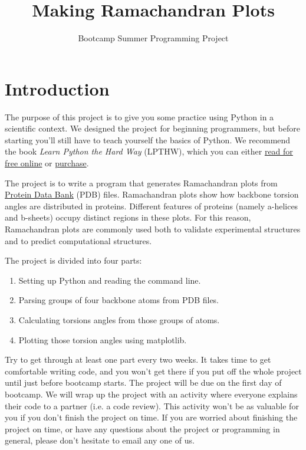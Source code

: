 \documentclass{article}
\newcommand{\ahelices}{\textgreek{a}-helices}
\newcommand{\bsheets}{\textgreek{b}-sheets}
\begin{document}
\title{Making Ramachandran Plots}
\author{Bootcamp Summer Programming Project}
\date{}
\maketitle{}

\section{Introduction}

The purpose of this project is to give you some practice using Python in a 
scientific context.  We designed the project for beginning programmers, but 
before starting you'll still have to teach yourself the basics of Python.  We 
recommend the book \emph{Learn Python the Hard Way} (LPTHW), which you can 
either \href{http://learnpythonthehardway.org/book/}{read for free online} or 
\href{https://paydiv.io/access/buy/2/}{purchase}.

The project is to write a program that generates Ramachandran plots from 
\href{http://www.rcsb.org/pdb/home/home.do}{Protein Data Bank} (PDB) files.  
Ramachandran plots show how backbone torsion angles are distributed in 
proteins.  Different features of proteins (namely \ahelices{} and \bsheets{}) 
occupy distinct regions in these plots.  For this reason, Ramachandran plots 
are commonly used both to validate experimental structures and to predict 
computational structures.

The project is divided into four parts:

\begin{enumerate}
 \item Setting up Python and reading the command line.
 \item Parsing groups of four backbone atoms from PDB files.
 \item Calculating torsions angles from those groups of atoms.
 \item Plotting those torsion angles using matplotlib.
\end{enumerate}

Try to get through at least one part every two weeks.  It takes time to get 
comfortable writing code, and you won't get there if you put off the whole 
project until just before bootcamp starts.  The project will be due on the 
first day of bootcamp.  We will wrap up the project with an activity where 
everyone explains their code to a partner (i.e. a code review).  This activity 
won't be as valuable for you if you don't finish the project on time.  If you 
are worried about finishing the project on time, or have any questions about 
the project or programming in general, please don't hesitate to email any one 
of us.
\end{document}
